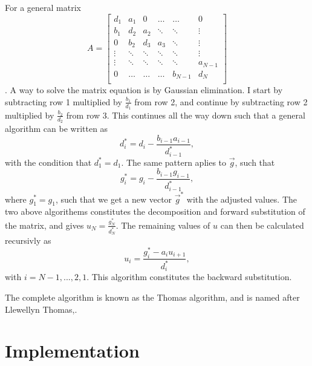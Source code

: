 \documentclass[english,notitlepage,reprint]{revtex4-1}  %
\begin{document}
For a general matrix
$$
	A =
	\begin{bmatrix}
	d_{1} & a_{1} & 0 & \dots & \dots & 0 \\
	b_{1} & d_{2} & a_{2} & \ddots & \ddots &\vdots \\
	0 & b_{2} & d_{3} & a_{3} & \ddots & \vdots \\
	\vdots & \ddots & \ddots & \ddots & \ddots & \vdots \\
	\vdots & \ddots & \ddots & \ddots & \ddots & a_{N-1} \\
	0 & \dots &\dots & \dots & b_{N-1} & d_{N} \\
	\end{bmatrix}
$$
\citep{DepartmentofPhysics2019}. A way to solve the matrix equation is by Gaussian elimination. I start by subtracting row 1 multiplied by \(\frac{b_{1}}{d_{1}}\) from row 2, and continue by subtracting row 2 multiplied by \(\frac{b_{2}}{d_{2}}\) from row 3. This continues all the way down such that a general algorithm can be written as
\begin{equation}
	d_{i}^{*}=d_{i}-\frac{b_{i-1}a_{i-1}}{d_{i-1}^{*}}, \label{eq:1}
\end{equation}
with the condition that \(d^{*}_{1}=d_{1}\). The same pattern aplies to \(\vec{g}\), such that
\begin{equation}
	g_{i}^{*} = g_{i}-\frac{b_{i-1}g_{i-1}}{d_{i-1}^{*}}, \label{eq:2}
\end{equation}
where \(g_{1}^{*} = g_{1}\), such that we get a new vector \(\vec{g}^{*}\) with the adjusted values. The two above algorithems constitutes the decomposition and forward substitution of the matrix, and gives \(u_{N}=\frac{g_{N}^{*}}{d_{N}^{*}}\). The remaining values of \(u\) can then be calculated recursivly as
\begin{equation}
		u_{i} = \frac{g_{i}^{*}-a_{i}u_{i+1}}{d_{i}^{*}}, \label{eq:3}
\end{equation}
with \(i = N-1,...,2,1\). This algorithm constitutes the backward substitution.

The complete algorithm is known as the Thomas algorithm, and is named after Llewellyn Thomas\citep{Datta2010},.

\section{Implementation}\label{sec:3}
\end{document}
